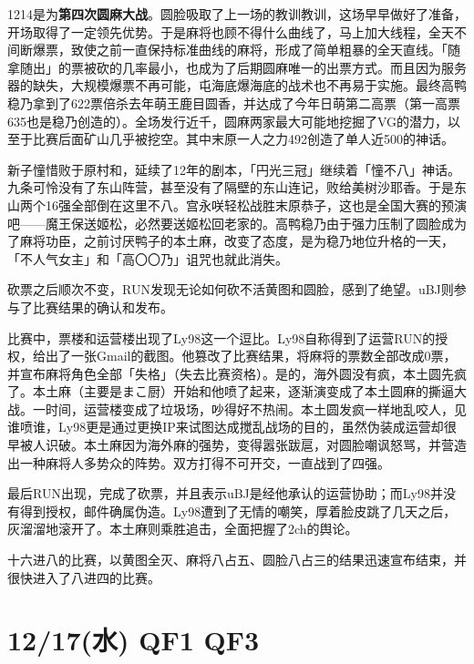
1214是为\textbf{第四次圆麻大战}。圆脸吸取了上一场的教训教训，这场早早做好了准备，开场取得了一定领先优势。于是麻将也顾不得什么曲线了，马上加大线程，全天不间断爆票，致使之前一直保持标准曲线的麻将，形成了简单粗暴的全天直线。「随拿随出」的票被砍的几率最小，也成为了后期圆麻唯一的出票方式。而且因为服务器的缺失，大规模爆票不再可能，屯海底爆海底的战术也不再易于实施。最终高鸭稳乃拿到了622票倍杀去年萌王鹿目圆香，并达成了今年日萌第二高票（第一高票635也是稳乃创造的）。全场发行近千，圆麻两家最大可能地挖掘了VG的潜力，以至于比赛后面矿山几乎被挖空。其中末原一人之力492创造了单人近500的神话。

新子憧惜败于原村和，延续了12年的剧本，「円光三冠」继续着「憧不八」神话。九条可怜没有了东山阵营，甚至没有了隔壁的东山连记，败给美树沙耶香。于是东山两个16强全部倒在这里不八。宫永咲轻松战胜末原恭子，这也是全国大赛的预演吧——魔王保送姬松，必然要送姬松回老家的。高鸭稳乃由于强力压制了圆脸成为了麻将功臣，之前讨厌鸭子的本土麻，改变了态度，是为稳乃地位升格的一天，「不人气女主」和「高〇〇乃」诅咒也就此消失。

砍票之后顺次不变，RUN发现无论如何砍不活黄图和圆脸，感到了绝望。uBJ则参与了比赛结果的确认和发布。

比赛中，票楼和运营楼出现了Ly98这一个逗比。Ly98自称得到了运营RUN的授权，给出了一张Gmail的截图。他篡改了比赛结果，将麻将的票数全部改成0票，并宣布麻将角色全部「失格」（失去比赛资格）。是的，海外圆没有疯，本土圆先疯了。本土麻（主要是まこ厨）开始和他喷了起来，逐渐演变成了本土圆麻的撕逼大战。一时间，运营楼变成了垃圾场，吵得好不热闹。本土圆发疯一样地乱咬人，见谁喷谁，Ly98更是通过更换IP来试图达成搅乱战场的目的，虽然伪装成运营却很早被人识破。本土麻因为海外麻的强势，变得嚣张跋扈，对圆脸嘲讽怒骂，并营造出一种麻将人多势众的阵势。双方打得不可开交，一直战到了四强。

最后RUN出现，完成了砍票，并且表示uBJ是经他承认的运营协助；而Ly98并没有得到授权，邮件确属伪造。Ly98遭到了无情的嘲笑，厚着脸皮跳了几天之后，灰溜溜地滚开了。本土麻则乘胜追击，全面把握了2ch的舆论。

十六进八的比赛，以黄图全灭、麻将八占五、圆脸八占三的结果迅速宣布结束，并很快进入了八进四的比赛。

\section{12/17(水) QF1 QF3}


